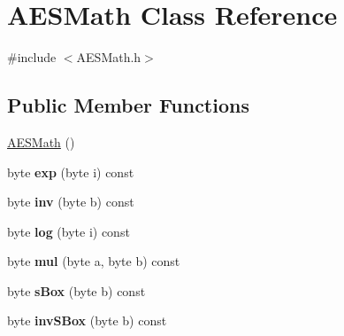 \hypertarget{classAESMath}{}\section{A\+E\+S\+Math Class Reference}
\label{classAESMath}


{\ttfamily \#include $<$A\+E\+S\+Math.\+h$>$}

\subsection*{Public Member Functions}
\begin{DoxyCompactItemize}
\item 
\hyperlink{classAESMath_a09bba3b08a03d0bd2abf1d20473bc895}{A\+E\+S\+Math} ()
\item 
\mbox{\label{classAESMath_aed763f8e7b98d7d9c2bbf927b92f4c10}} 
byte {\bfseries exp} (byte i) const
\item 
\mbox{\label{classAESMath_aff0439aae492e373f657dc157ecd7ca6}} 
byte {\bfseries inv} (byte b) const
\item 
\mbox{\label{classAESMath_a81dc0d4d9c71f76c9ab161b322af3dc0}} 
byte {\bfseries log} (byte i) const
\item 
\mbox{\label{classAESMath_a842cd3b0a60f9107120118cdfc3629b5}} 
byte {\bfseries mul} (byte a, byte b) const
\item 
\mbox{\label{classAESMath_a9ce0a17ec84450d84559a814251061ae}} 
byte {\bfseries s\+Box} (byte b) const
\item 
\mbox{\label{classAESMath_a6f17ad9d2c0a001ba953ac7575f16d8a}} 
byte {\bfseries inv\+S\+Box} (byte b) const
\end{DoxyCompactItemize}
